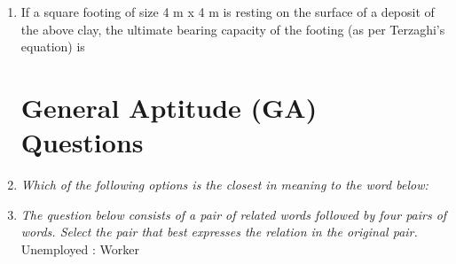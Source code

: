 \documentclass[journal,12pt,onecolumn]{IEEEtran}
\theoremstyle{remark}
\begin{document}
\begin{enumerate}
\setlength{\parskip}{0.5cm}
\noindent\item If a square footing of size 4 m x 4 m is resting on the surface of a deposit of the above clay, the ultimate bearing capacity of the footing (as per Terzaghi’s equation) is

\setlength{\parskip}{0.5cm}

\hfill{}
\begin{enumerate}
\end{enumerate}

\section*{General Aptitude (GA) Questions}


\setlength{\parskip}{0.5cm}
\noindent \item \textit{Which of the following options is the closest in meaning to the word below:}\\


\hfill{}
\begin{enumerate}
\end{enumerate}

\setlength{\parskip}{0.5cm}
\noindent\item \textit{The question below consists of a pair of related words followed by four pairs of words. Select the pair that best expresses the relation in the original pair.}\\
Unemployed : Worker \hfill{}
\begin{enumerate}
\end{enumerate}


\end{enumerate}
\end{document}
